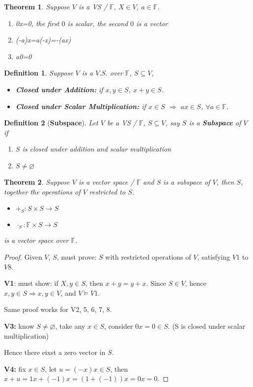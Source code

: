 \documentclass[12pt]{article}
\newtheorem{theorem}{Theorem}[subsection]
\newtheorem{definition}{Definition}[subsection]
\newcommand{\mF}{{\mathbb{F}}}
\let\emptyset\varnothing
\begin{document}
	\begin{theorem}
		Suppose $V$ is a VS / $\mathbb{F}$, $X\in V$, $a\in \mathbb{F}$. 
		\begin{enumerate}
			\item 0x=0, the first $0$ is scalar, the second $0$ is a vector
			\item (-a)x=a(-x)=-(ax)
			\item a0=0 \\
		\end{enumerate}
	\end{theorem}
	
	\begin{definition}
		Suppose $V$ is a $V.S.$ over $\mathbb{F}$, $S\subseteq V$, 
		\begin{itemize}
			\item \textbf{Closed under Addition:} 
				if $x, y \in S$, $x+y\in S$. 
			\item \textbf{Closed under Scalar Multiplication:} 
				if $x\in S$ $\Rightarrow$ $ax\in S$, $\forall a\in \mathbb{F}$.\\
		\end{itemize}
	\end{definition}
	
	\begin{definition}[\textbf{Subspace}]
		Let $V$ be a VS / $\mathbb{F}$, $S\subseteq V$, say $S$ is a \textbf{
		Subspace} of $V$ if 
		\begin{enumerate}
			\item $S$ is closed under addition and scalar multiplication
			\item $S\neq \emptyset$\\
		\end{enumerate}
	\end{definition}

	\begin{theorem}
		Suppose $V$ is a vector space / $\mathbb{F}$ and $S$ is a subspace of 
		$V$, then $S$, together the operations of $V$ restricted to $S$.
		\begin{itemize}
			\item $+_S : S \times S \to S$
			\item $\cdot_S : \mathbb{F} \times S \to S$
		\end{itemize}
		is a vector space over $\mF$. 
	\end{theorem}
	\begin{proof}
		Given $V$, $S$, must prove: $S$ with restricted operations of $V$, 
		satisfying $V1$ to $V8$. 

		\textbf{V1}: must show: if $X, y \in S$, then $x + y = y + x$. 
			Since $S\in V$, hence $x, y \in S \Rightarrow x, y \in V$, and 
			$V \models V1$.

		Same proof works for V2, 5, 6, 7, 8.

		\textbf{V3:} know $S\neq \emptyset$, take any $x\in S$, consider
		$0x=0 \in S$. (S is closed under scalar multiplication)

		Hence there eixst a zero vector in $S$.

		\textbf{V4:} fix $x\in S$, let $u = (-x)x \in S$,
		then $x + u = 1x + (-1)x = (1+(-1))x=0x=0$.
	\end{proof}
\end{document}
